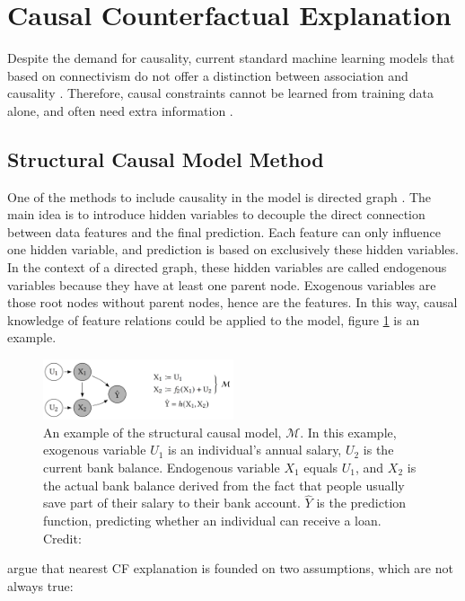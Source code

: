 \section{Causal Counterfactual Explanation}\label{sec:Causality}
Despite the demand for causality, current standard machine learning models that based on connectivism do not offer a distinction between association and causality \cite{diffThatMakesDiff}. Therefore, causal constraints cannot be learned from training data alone, and often need extra information \cite{bookCausality,preservingCausal}.
\subsection{Structural Causal Model Method}
One of the methods to include causality in the model is directed graph \cite{algorithmicrecourse}. The main idea is to introduce hidden variables to decouple the direct connection between data features and the final prediction. Each feature can only influence one hidden variable, and prediction is based on exclusively these hidden variables. In the context of a directed graph, these hidden variables are called endogenous variables because they have at least one parent node. Exogenous variables are those root nodes without parent nodes, hence are the features. In this way, causal knowledge of feature relations could be applied to the model, figure \ref{fig:directedGraph} is an example.
\begin{figure}
  \centering
  \includegraphics[width=0.5\textwidth]{directedGraph.PNG}
  \caption{An example of the structural causal model, $\mathcal{M}$. In this example, exogenous variable $U_1$ is an individual's annual salary, $U_2$ is the current bank balance. Endogenous variable $X_1$ equals $U_1$, and $X_2$ is the actual bank balance derived from the fact that people usually save part of their salary to their bank account. $\hat Y$ is the prediction function, predicting whether an individual can receive a loan. Credit:\cite{algorithmicrecourse}}
  \label{fig:directedGraph}
\end{figure}

\citeauthor{algorithmicrecourse} \cite{algorithmicrecourse} argue that nearest CF explanation is founded on two assumptions, which are not always true:

